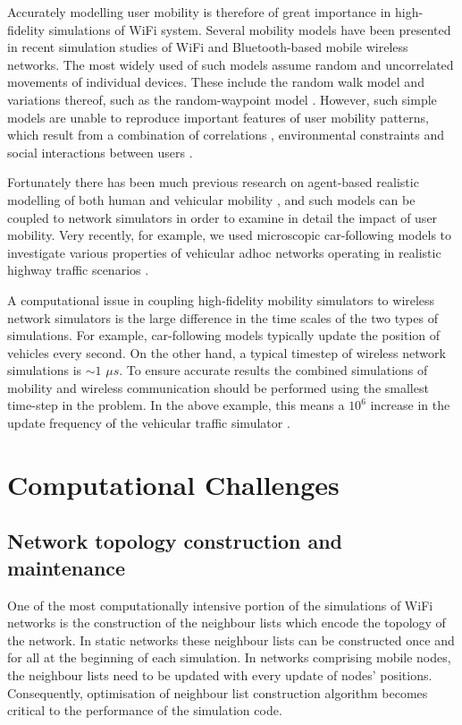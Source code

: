 \documentclass{elsart}
\begin{document}
Accurately modelling  user mobility is therefore of great importance in 
high-fidelity simulations of WiFi system. Several 
mobility models have been presented in recent simulation
studies of WiFi and Bluetooth-based mobile wireless networks. The most 
widely used of such models assume random and uncorrelated 
movements of individual devices. These include the random walk model 
and variations thereof, such as the random-waypoint model \cite{camp}.
However, such simple models are unable to reproduce important 
features of user mobility patterns, which result from a 
combination of  correlations \cite{helbig}, environmental constraints
\cite{helbig} and social interactions between users \cite{mascolo}.

Fortunately there has been much 
previous research on agent-based realistic modelling of both human and 
vehicular mobility \cite{helbig,ball}, and such models  
can be coupled to network simulators in order 
to examine in detail the impact of user mobility.
Very recently, for example, we used 
microscopic car-following models to investigate various properties 
of vehicular adhoc networks operating in realistic highway traffic scenarios \cite{maziar-vanet}.

A computational issue in coupling high-fidelity 
mobility simulators to wireless network simulators is the 
large difference in the time scales of the two types of simulations.
For example, car-following models typically 
update the position of vehicles every second. On the other hand, a typical 
timestep of wireless network simulations is $\sim 1$ $\mu s$.
To ensure accurate results the combined simulations of 
mobility and wireless communication should be performed using the smallest
time-step in the problem. In the above example, this means a 
$10^6$ increase in the update frequency of the vehicular traffic simulator
\cite{vanet}.

 
\section{Computational Challenges}

\subsection{Network topology construction and maintenance}
One of the most computationally intensive portion of 
the simulations of WiFi networks is 
the construction of the neighbour lists which encode the topology 
of the network.
In static networks these neighbour lists can be constructed once and for all 
at the beginning of each simulation. In networks comprising  
mobile nodes, the neighbour lists need to be updated with 
every update of  nodes' positions. Consequently,
optimisation of neighbour list construction algorithm 
becomes critical to the performance of the simulation code.
\end{document}
